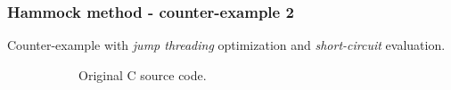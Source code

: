 \documentclass[aspectratio=1610]{beamer}
\begin{document}
\begin{frame}[noframenumbering]
\begin{figure}[htbp]
\begin{subfigure}[b]{0.50\textwidth}
ure}
	\end{figure}
\end{frame}

\begin{frame}[noframenumbering]
	\frametitle{Hammock method - counter-example 2}
	Counter-example with \textit{jump threading} optimization and \textit{short-circuit} evaluation.
	\begin{figure}[htbp]
		\centering
		\begin{subfigure}[b]{0.30\textwidth}
			\centering
			
			\caption{Original C source code.}
		\end{subfigure}
		\begin{subfigure}[b]{0.50\textwidth}
			\centering

\end{subfigure}
\end{figure}
\end{frame}
\end{document}
